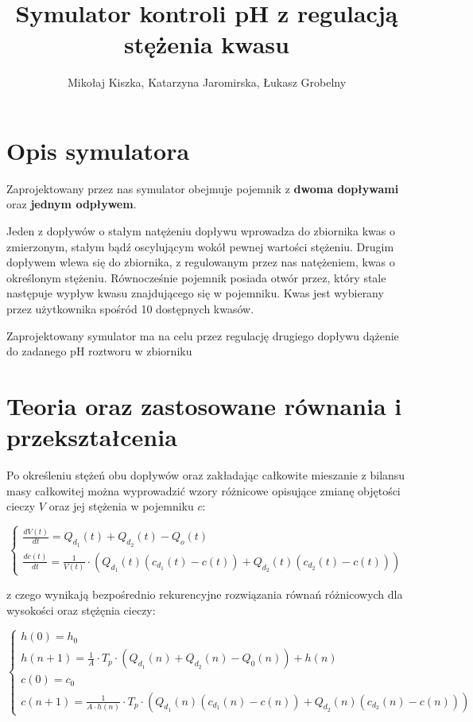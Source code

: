 \documentclass[polish,polish,a4paper,12pt]{article}
\title{Symulator kontroli pH z regulacją stężenia kwasu}
\date{}
\author{Mikołaj Kiszka, Katarzyna Jaromirska, Łukasz Grobelny}
\begin{document}
	
	\maketitle
	\vspace{-4\baselineskip}
	
	\section{Opis symulatora}
	
	Zaprojektowany przez nas symulator obejmuje pojemnik z \textbf{dwoma dopływami} oraz \textbf{jednym odpływem}. 
	
	Jeden z dopływów o stałym natężeniu dopływu wprowadza do zbiornika kwas o zmierzonym, stałym bądź oscylującym wokół pewnej wartości stężeniu. Drugim dopływem wlewa się do zbiornika, z regulowanym przez nas natężeniem, kwas o określonym stężeniu. Równocześnie pojemnik posiada otwór przez, który stale następuje wypływ kwasu znajdującego się w pojemniku. Kwas jest wybierany przez użytkownika spośród 10 dostępnych kwasów.
	
	Zaprojektowany symulator ma na celu przez regulację drugiego dopływu dążenie do zadanego pH roztworu w zbiorniku
	
	\section{Teoria oraz zastosowane równania i przekształcenia}
	
	Po określeniu stężeń obu dopływów oraz zakładając całkowite mieszanie z bilansu masy całkowitej można wyprowadzić wzory różnicowe opisujące zmianę objętości cieczy $V$ oraz jej stężenia w pojemniku $c$:
	
	\begin{equation}
		\begin{cases}
			\frac{dV(t)}{dt} = Q_{d_{1}}(t) + Q_{d_{2}}(t) - Q_{o}(t) \\
			\frac{dc(t)}{dt} = \frac{1}{V(t)} \cdot \left(Q_{d_{1}}(t) \left(c_{d_{1}}(t) - c(t)\right) + Q_{d_{2}}(t)\left(c_{d_{2}}(t) - c(t)\right)\right)		
		\end{cases}
	\end{equation}
	
	z czego wynikają bezpośrednio rekurencyjne rozwiązania równań różnicowych dla wysokości oraz stężęnia cieczy:
	
	\begin{equation}
		\begin{cases}
			h(0) = h_{0}\\
			h(n+1) =\frac{1}{A} \cdot T_{p} \cdot \left(Q_{d_{1}}(n) + Q_{d_{2}}(n) - Q_{0}(n)\right) + h(n)\\
			c(0) = c_{0}\\
			c(n+1) = \frac{1}{A \cdot  h(n)} \cdot T_{p} \cdot \left(Q_{d_{1}}(n)\left(c_{d_{1}}(n) - c(n)\right) + Q_{d_{2}}(n)\left(c_{d_{2}}(n) - c(n)\right)\right)
		\end{cases}
	\end{equation}
	
\end{document}
